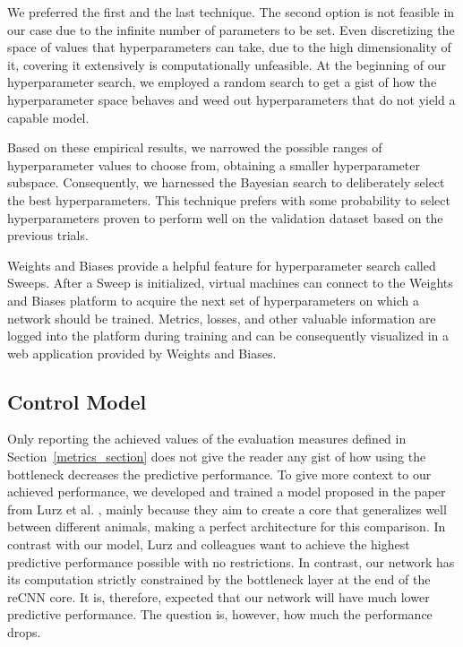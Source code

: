 We preferred the first and the last technique. The second option is not feasible in our case due to the infinite number of parameters to be set. Even discretizing the space of values that hyperparameters can take, due to the high dimensionality of it, covering it extensively is computationally unfeasible. 
At the beginning of our hyperparameter search, we employed a random search to get a gist of how the hyperparameter space behaves and weed out hyperparameters that do not yield a capable model.

Based on these empirical results, we narrowed the possible ranges of hyperparameter values to choose from, obtaining a smaller hyperparameter subspace. Consequently, we harnessed the Bayesian search to deliberately select the best hyperparameters. This technique prefers with some probability to select hyperparameters proven to perform well on the validation dataset based on the previous trials.

Weights and Biases provide a helpful feature for hyperparameter search called Sweeps. After a Sweep is initialized, virtual machines can connect to the Weights and Biases platform to acquire the next set of hyperparameters on which a network should be trained. Metrics, losses, and other valuable information are logged into the platform during training and can be consequently visualized in a web application provided by Weights and Biases.

\subsection{Control Model}

Only reporting the achieved values of the evaluation measures defined in Section~\ref{metrics_section} does not give the reader any gist of how using the bottleneck decreases the predictive performance. To give more context to our achieved performance, we developed and trained a model proposed in the paper from Lurz et al. \citep{lurz2021generalization}, mainly because they aim to create a core that generalizes well between different animals, making a perfect architecture for this comparison. In contrast with our model, Lurz and colleagues want to achieve the highest predictive performance possible with no restrictions. In contrast, our network has its computation strictly constrained by the bottleneck layer at the end of the reCNN core. It is, therefore, expected that our network will have much lower predictive performance. The question is, however, how much the performance drops.

